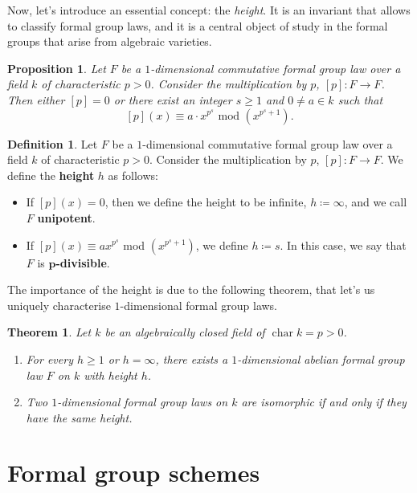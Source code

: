 \documentclass{report}
\DeclareMathOperator{\chara}{char}
\newtheorem{theorem}[equation]{Theorem}
\newtheorem{proposition}[equation]{Proposition}
\theoremstyle{definition}
\newtheorem{definition}[equation]{Definition}
\begin{document}
Now, let's introduce an essential concept: the \emph{height}. It is an invariant that allows to classify formal group laws, and it is a central object of study in the formal groups that arise from algebraic varieties.

\begin{proposition}
Let $F$ be a $1$-dimensional commutative formal group law over a field $k$ of characteristic $p>0$. Consider the multiplication by $p$, $[p]:F\rightarrow F$. Then either $[p]=0$ or there exist an integer $s\geq1$ and $0\neq a\in k$ such that
\[[p](x)\equiv a\cdot x^{p^s}\text{ mod }(x^{p^s+1}).\]
\end{proposition}

\begin{definition}
Let $F$ be a $1$-dimensional commutative formal group law over a field $k$ of characteristic $p>0$. Consider the multiplication by $p$, $[p]:F\rightarrow F$. We define the \textbf{height} $h$ as follows:
\begin{itemize}
\item If $[p](x)=0$, then we define the height to be infinite, $h\coloneqq\infty$, and we call $F$ \textbf{unipotent}.

\item If $[p](x)\equiv ax^{p^s}$ mod $(x^{p^s+1})$, we define $h\coloneqq s$. In this case, we say that $F$ is \textbf{$\boldsymbol{p}$-divisible}.
\end{itemize}
\end{definition}

The importance of the height is due to the following theorem, that let's us uniquely characterise $1$-dimensional formal group laws.

\begin{theorem}
Let $k$ be an algebraically closed field of $\chara k=p>0$.
\begin{enumerate}
\item \cite[Corollaire~1]{lazard1955groupes} For every $h\geq1$ or $h=\infty$, there exists a $1$-dimensional abelian formal group law $F$ on $k$ with height $h$.
\item \cite[Th\'{e}or\`{e}me~IV]{lazard1955groupes} Two $1$-dimensional formal group laws on $k$ are isomorphic if and only if they have the same height.
\end{enumerate}
\end{theorem}

\section{Formal group schemes}
\end{document}
